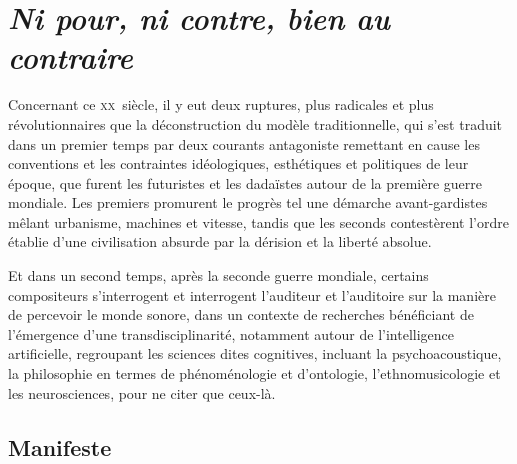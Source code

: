 \documentclass{article}
\begin{document}
%
%

\section{\textit{Ni pour, ni contre, bien au contraire}}

Concernant ce \textsc{xx}\ieme ~siècle, il y eut deux ruptures, plus radicales et plus révolutionnaires que la déconstruction du modèle traditionnelle, %
qui s'est traduit dans un premier temps par deux courants antagoniste remettant en cause les conventions et les contraintes idéologiques, esthétiques et politiques de leur époque, que furent les futuristes %
et les dadaïstes autour de la première guerre mondiale. Les premiers promurent le progrès tel une démarche avant-gardistes mêlant urbanisme, machines et vitesse, tandis que les seconds contestèrent l'ordre établie d'une civilisation absurde par la dérision et la liberté absolue. 

Et dans un second temps, après la seconde guerre mondiale, certains compositeurs s'interrogent et interrogent l'auditeur et l'auditoire sur la manière de percevoir le monde sonore, dans un contexte de recherches bénéficiant de l'émergence d'une transdisciplinarité, notamment autour de l'intelligence artificielle, regroupant les sciences dites cognitives, incluant la psychoacoustique, la philosophie en termes de phénoménologie et d'ontologie, l'ethnomusicologie et les neurosciences, pour ne citer que ceux-là.

\subsection{Manifeste}
\end{document}
